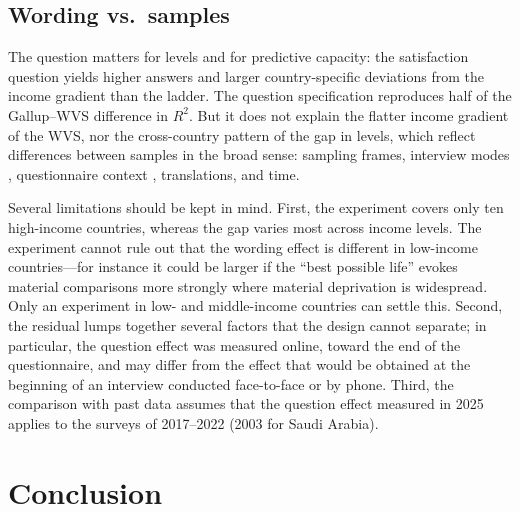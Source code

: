 \documentclass[12pt]{article}
\begin{document}
\subsection{Wording vs.\ samples}
The question matters for levels and for predictive capacity: the satisfaction question yields higher answers and larger country-specific deviations from the income gradient than the ladder. The question specification reproduces half of the Gallup--WVS difference in $R^2$. 
But it does not explain the flatter income gradient of the WVS, nor the cross-country pattern of the gap in levels, which reflect differences between samples in the broad sense: sampling frames, interview modes \citep{dolan_happy_2016,conti_survey_2011}, questionnaire context \citep{deaton_financial_2012,deaton_understanding_2016}, translations, and time.

Several limitations should be kept in mind. First, the experiment covers only ten high-income countries, whereas the gap varies most across income levels.  %
The experiment cannot rule out that the wording effect is different in low-income countries---for instance it could be larger if the ``best possible life'' evokes material comparisons more strongly where material deprivation is widespread. Only an experiment in low- and middle-income countries can settle this. Second, the residual lumps together several factors that the design cannot separate; in particular, the question effect was measured online, toward the end of the questionnaire, and may differ from the effect that would be obtained at the beginning of an interview conducted face-to-face or by phone. Third, the comparison with past data assumes that the question effect measured in 2025 applies to the surveys of 2017--2022 (2003 for Saudi Arabia).


\section{Conclusion}\label{sec:conclusion}
\end{document}
